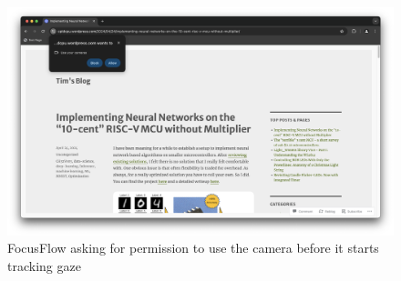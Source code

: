 \documentclass{report}
\begin{document}
\begin{figure}
    \begin{center}
        \includegraphics[scale=0.25]{../assets/FocusFlow-camera-perms.png}
    \end{center}
    \caption{FocusFlow asking for permission to use the camera before it starts tracking gaze}
    \label{fig:ff-camera}
\end{figure}
\end{document}
